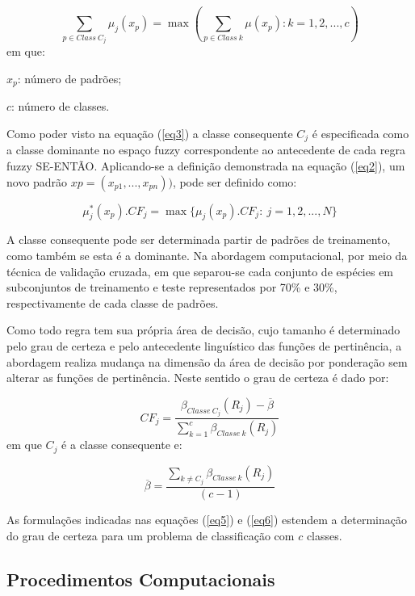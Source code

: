 \documentclass[12pt,a4paper]{article}
\numberwithin{equation}{section}
\begin{document}
\begin{equation} \label{eq3}
\sum_{p\in Class~C_{j}} \mu_{j}(x_p)=\max(\sum_{p\in Class~k}\mu(x_{p}):k=1,2,...,c)
\end{equation}
em que:

$x_{p}$: número de padrões;

$c$: número de classes.

Como poder visto na equação (\ref{eq3}) a classe consequente $C_{j}$ é especificada como a classe dominante no espaço fuzzy correspondente ao antecedente de cada regra fuzzy SE-ENTÃO. Aplicando-se a definição demonstrada na equação (\ref{eq2}), um novo padrão $x{p}=(x_{p1},...,x_{pn}))$, pode ser definido como:

\begin{equation} \label{eq4}
\mu_{j}^{ *}(x_{p}).CF_{j}=\max\lbrace\mu_{j}(x_{p}).CF_{j}:~j=1,2,...,N\rbrace
\end{equation}

A classe consequente pode ser determinada partir de padrões de treinamento, como também se esta é a dominante. Na abordagem computacional, por meio da técnica de validação cruzada, em que separou-se cada conjunto de espécies em subconjuntos de treinamento e teste representados por  70\% e 30\%, respectivamente de cada classe de padrões. 

Como todo regra tem sua própria área de decisão, cujo tamanho é determinado pelo grau de certeza e pelo antecedente linguístico das funções de pertinência, a abordagem realiza mudança na dimensão da área de decisão por ponderação sem alterar as funções de pertinência. Neste sentido o grau de certeza é dado por:

\begin{equation} \label{eq5}
CF_{j}=\frac{\beta_{Classe~C_{j}}(R_{j})-\overline{\beta}}{\sum_{k=1}^{c}\beta_{Classe~k}(R_{j})}
\end{equation}
em que $C_{j}$ é a classe consequente e:

\begin{equation} \label{eq6}
\overline{\beta}=\frac{\sum_{k\neq C_{j}}\beta_{Classe~k}(R_{j})}{(c-1)}
\end{equation}

As formulações indicadas nas equações (\ref{eq5}) e (\ref{eq6})  estendem a determinação do grau de certeza para um problema de classificação com $c$ classes.

\subsection{Procedimentos Computacionais}
\end{document}
